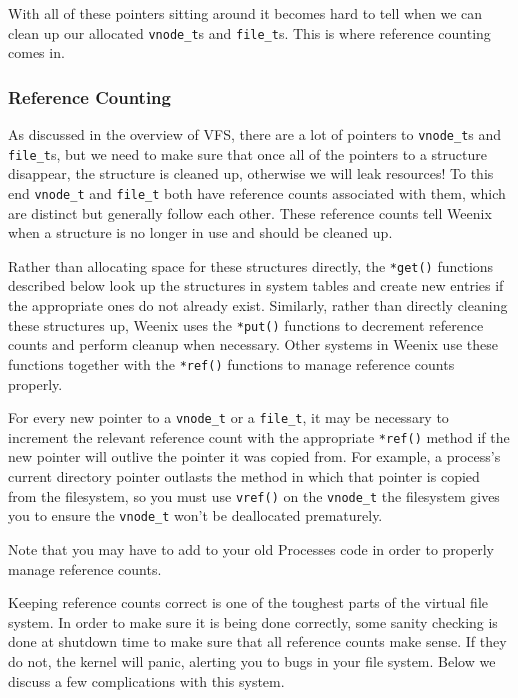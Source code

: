 With all of these pointers sitting around it becomes hard to tell when we can clean up our allocated \texttt{vnode\_t}s and \texttt{file\_t}s. This is where reference counting comes in.


\subsubsection{Reference Counting}

As discussed in the overview of VFS, there are a lot of pointers to \texttt{vnode\_t}s and \texttt{file\_t}s, but we need to make sure that once all of the pointers to a structure disappear, the structure is cleaned up, otherwise we will leak resources! To this end \texttt{vnode\_t} and \texttt{file\_t} both have reference counts associated with them, which are distinct but generally follow each other. These reference counts tell Weenix when a structure is no longer in use and should be cleaned up.

Rather than allocating space for these structures directly, the \texttt{*get()} functions described below look up the structures in system tables and create new entries if the appropriate ones do not already exist. Similarly, rather than directly cleaning these structures up, Weenix uses the \texttt{*put()} functions to decrement reference counts and perform cleanup when necessary. Other systems in Weenix use these functions together with the \texttt{*ref()} functions to manage reference counts properly.

For every new pointer to a \texttt{vnode\_t} or a \texttt{file\_t}, it may be necessary to increment the relevant reference count with the appropriate \texttt{*ref()} method if the new pointer will outlive the pointer it was copied from. For example, a process's current directory pointer outlasts the method in which that pointer is copied from the filesystem, so you must use \texttt{vref()} on the \texttt{vnode\_t} the filesystem gives you to ensure the \texttt{vnode\_t} won't be deallocated prematurely.

Note that you may have to add to your old Processes code in order to properly manage reference counts.

Keeping reference counts correct is one of the toughest parts of the virtual file system. In order to make sure it is being done correctly, some sanity checking is done at shutdown time to make sure that all reference counts make sense. If they do not, the kernel will panic, alerting you to bugs in your file system. Below we discuss a few complications with this system.

